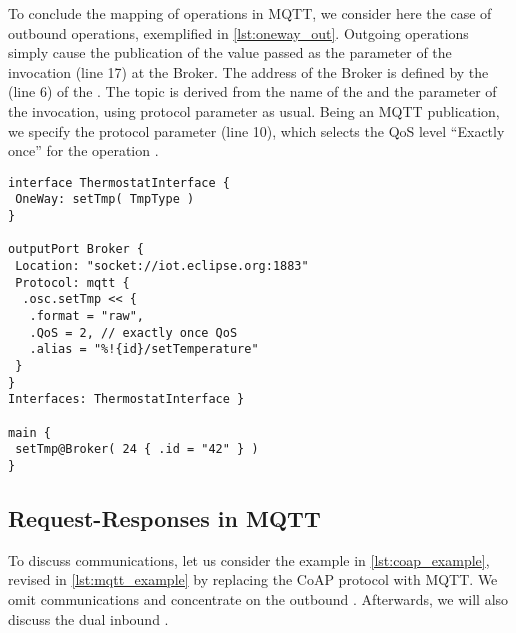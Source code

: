 


To conclude the mapping of  operations in MQTT, we consider here
the case of outbound operations, exemplified in \cref{lst:oneway_out}.
%
Outgoing  operations simply cause the publication of the value
passed as the parameter of the invocation (line 17) at the Broker. The
address of the Broker is defined by the  (line 6) of the
 . The topic is derived from the name of the
 and the parameter of the invocation, using protocol parameter
 as usual. Being an MQTT publication, we specify the
 protocol parameter (line 10), which selects the QoS level
``Exactly once'' for the operation .

\begin{lstlisting}[basicstyle=\footnotesize\ttfamily,caption={Example of
outgoing MQTT \code{OneWay} communication.},label=lst:oneway_out]
interface ThermostatInterface {
 OneWay: setTmp( TmpType )
}

outputPort Broker {
 Location: "socket://iot.eclipse.org:1883"
 Protocol: mqtt {
  .osc.setTmp << {
   .format = "raw",
   .QoS = 2, // exactly once QoS
   .alias = "%!{id}/setTemperature"
 }
}
Interfaces: ThermostatInterface }

main { 
 setTmp@Broker( 24 { .id = "42" } )
}
\end{lstlisting}

\subsection{Request-Responses in MQTT}
\label{sub:rr_in_mqtt}

To discuss  communications, let us consider the
example in \cref{lst:coap_example}, revised in \cref{lst:mqtt_example}
by replacing the CoAP protocol with MQTT. We omit 
communications and concentrate on the
outbound . Afterwards, we will also discuss the
dual inbound .

